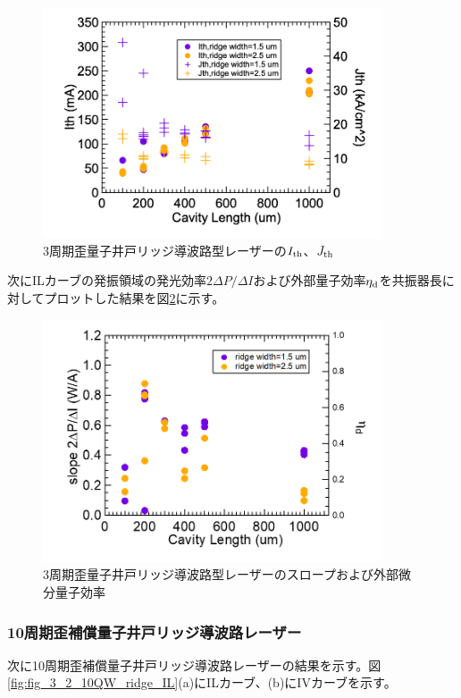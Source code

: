 {\begin{figure}[h]
	\centering
	\includegraphics[width=10cm]{figure/fig_3_2_3QW_ridge_Ith.png}
		\caption{3周期歪量子井戸リッジ導波路型レーザーの$I_{\rm{th}}$、$J_{\rm{th}}$}
		\label{fig:fig_3_2_3QW_ridge_Ith}
\end{figure}
次にILカーブの発振領域の発光効率$2 \Delta P/\Delta I$および外部量子効率$\eta_{\rm{d}}$を共振器長に対してプロットした結果を図\ref{fig:fig_3_2_3QW_ridge_slope}に示す。
\begin{figure}[h]
	\centering
	\includegraphics[width=10cm]{figure/fig_3_2_3QW_ridge_slope.png}
		\caption{3周期歪量子井戸リッジ導波路型レーザーのスロープおよび外部微分量子効率}
		\label{fig:fig_3_2_3QW_ridge_slope}
\end{figure}

\clearpage
\subsubsection{10周期歪補償量子井戸リッジ導波路レーザー}
次に10周期歪補償量子井戸リッジ導波路レーザーの結果を示す。図\ref{fig:fig_3_2_10QW_ridge_IL}(a)にILカーブ、(b)にIVカーブを示す。

}
